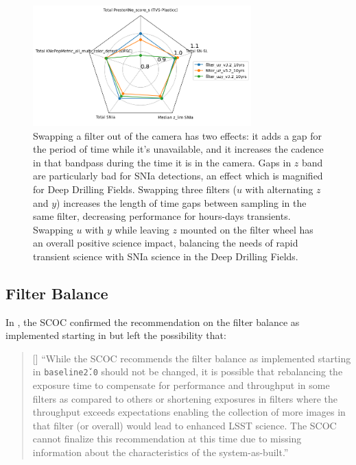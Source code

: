 \begin{figure}
\centering
\includegraphics[width=0.75\textwidth]{figures/filter_swap_KNe.png}
\caption{Swapping a filter out of the camera has two effects: it adds a gap for the period of time while it's unavailable, and it increases the cadence in that bandpass during the time it is in the camera. Gaps in $z$ band are particularly bad for SNIa detections, an effect which is magnified for Deep Drilling Fields. %
Swapping three filters ($u$ with alternating $z$ and $y$) increases the length of time gaps between sampling in the same filter, decreasing performance for hours-days transients.
Swapping $u$ with $y$ while leaving $z$ mounted on the filter wheel has an overall positive science impact, balancing the  needs of rapid transient science with SNIa science in the Deep Drilling Fields. }
\label{fig:swapping}
\end{figure}

\FloatBarrier
\subsection{Filter Balance}\label{sec:filterbalance}
 In , the SCOC confirmed the recommendation on the filter balance as implemented starting in  but left the possibility that:
  
 \begin{quote}[] ``While the SCOC recommends the filter balance as implemented starting in \texttt{baseline\v2.0} should not be changed, it is possible that rebalancing the
exposure time to compensate for performance and throughput in some filters as compared to others or shortening exposures in filters where the throughput exceeds expectations enabling the collection of more images in that filter (or overall) would lead to
enhanced LSST science. The SCOC cannot finalize this recommendation at this time due to
missing information about the characteristics of the system-as-built.''
\end{quote}

